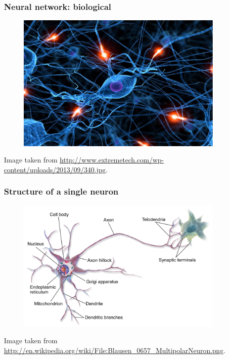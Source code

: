 \documentclass{beamer}
\begin{document}
\begin{frame}
\frametitle{Neural network: biological}
\begin{figure}[!h]
  \centering
  \includegraphics[width=0.9\textwidth]{neural-network-cool.jpg}
\end{figure}
\tiny{Image taken from \url{http://www.extremetech.com/wp-content/uploads/2013/09/340.jpg}}.
\end{frame}

\begin{frame}
\frametitle{Structure of a single neuron}
\begin{figure}[!h]
  \centering
  \includegraphics[width=0.9\textwidth]{Blausen_0657_MultipolarNeuron.png}
\end{figure}
\tiny{Image taken from \url{http://en.wikipedia.org/wiki/File:Blausen_0657_MultipolarNeuron.png}}.
\end{frame}
\end{document}
